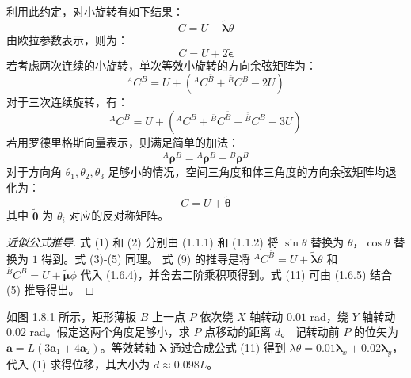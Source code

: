 利用此约定，对小旋转有如下结果：
\begin{equation}
C = U + \widetilde{\boldsymbol{\lambda}} \theta \tag{7}
\end{equation}
由欧拉参数表示，则为：
\begin{equation}
C = U + 2\widetilde{\boldsymbol{\epsilon}} \tag{8}
\end{equation}
若考虑两次连续的小旋转，单次等效小旋转的方向余弦矩阵为：
\begin{equation}
{}^A C^B = U + ({}^A C^{\bar{B}} + {}^{\bar{B}} C^B - 2U) \tag{9}
\end{equation}
对于三次连续旋转，有：
\begin{equation}
{}^A C^B = U + ({}^A C^{\bar{B}} + {}^{\bar{B}} C^{\bar{\bar{B}}} + {}^{\bar{\bar{B}}} C^B - 3U) \tag{10}
\end{equation}
若用罗德里格斯向量表示，则满足简单的加法：
\begin{equation}
{}^A \boldsymbol{\rho}^B = {}^A \boldsymbol{\rho}^{\bar{B}} + {}^{\bar{B}} \boldsymbol{\rho}^B \tag{11}
\end{equation}
对于方向角 \(\theta_1, \theta_2, \theta_3\) 足够小的情况，空间三角度和体三角度的方向余弦矩阵均退化为：
\begin{equation}
C = U + \widetilde{\boldsymbol{\theta}} \tag{12}
\end{equation}
其中 \(\widetilde{\boldsymbol{\theta}}\) 为 \(\theta_i\) 对应的反对称矩阵。

\begin{proof}[近似公式推导]
式 (1) 和 (2) 分别由 (1.1.1) 和 (1.1.2) 将 \(\sin\theta\) 替换为 \(\theta\)，\(\cos\theta\) 替换为 \(1\) 得到。式 (3)-(5) 同理。
式 (9) 的推导是将 \({}^A C^{\bar{B}} = U + \widetilde{\boldsymbol{\lambda}}\theta\) 和 \({}^{\bar{B}} C^B = U + \widetilde{\boldsymbol{\mu}}\phi\) 代入 (1.6.4)，并舍去二阶乘积项得到。式 (11) 可由 (1.6.5) 结合 (5) 推导得出。
\end{proof}

\begin{example}[薄板的小转动位移]
如图 1.8.1 所示，矩形薄板 \(B\) 上一点 \(P\) 依次绕 \(X\) 轴转动 \(0.01\) rad，绕 \(Y\) 轴转动 \(0.02\) rad。假定这两个角度足够小，求 \(P\) 点移动的距离 \(d\)。
记转动前 \(P\) 的位矢为 \(\mathbf{a}=L(3\mathbf{a}_1+4\mathbf{a}_2)\)。等效转轴 \(\boldsymbol{\lambda}\) 通过合成公式 (11) 得到 \(\lambda\theta = 0.01\boldsymbol{\lambda}_x + 0.02\boldsymbol{\lambda}_y\)，代入 (1) 求得位移，其大小为 \(d \approx 0.098L\)。
\end{example}

